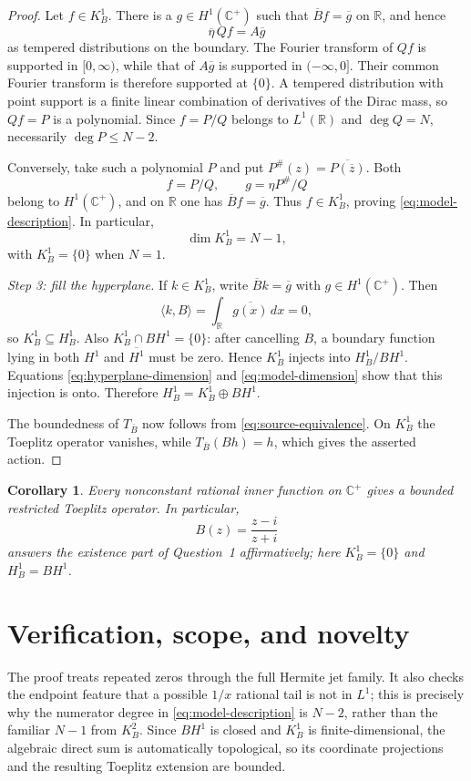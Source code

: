 \documentclass[11pt]{article}
\newtheorem{corollary}[theorem]{Corollary}
\newcommand{\C}{\mathbb C}
\newcommand{\R}{\mathbb R}
\newcommand{\Hone}{H^1(\C^+)}
\begin{document}
\begin{proof}
Let $f\in K^1_B$.  There is a $g\in\Hone$ such that
$\overline Bf=\overline g$ on $\R$, and hence
\[
 \overline\eta\,Qf=A\overline g
\]
as tempered distributions on the boundary.  The Fourier transform of $Qf$
is supported in $[0,\infty)$, while that of $A\overline g$ is supported in
$(-\infty,0]$.  Their common Fourier transform is therefore supported at
$\{0\}$.  A tempered distribution with point support is a finite linear
combination of derivatives of the Dirac mass, so $Qf=P$ is a polynomial.
Since $f=P/Q$ belongs to $L^1(\R)$ and $\deg Q=N$, necessarily
$\deg P\leq N-2$.

Conversely, take such a polynomial $P$ and put
$P^\#(z)=\overline{P(\overline z)}$.  Both
\[
 f=P/Q,
 \qquad g=\eta P^\#/Q
\]
belong to $\Hone$, and on $\R$ one has
$\overline Bf=\overline g$.  Thus $f\in K^1_B$, proving
\eqref{eq:model-description}.  In particular,
\begin{equation}\label{eq:model-dimension}
 \dim K^1_B=N-1,
\end{equation}
with $K^1_B=\{0\}$ when $N=1$.

\emph{Step 3: fill the hyperplane.}
If $k\in K^1_B$, write $\overline Bk=\overline g$ with $g\in\Hone$.
Then
\[
 \langle k,B\rangle=\int_{\R}\overline{g(x)}\,dx=0,
\]
so $K^1_B\subseteq H^1_B$.  Also $K^1_B\cap BH^1=\{0\}$: after cancelling
$B$, a boundary function lying in both $H^1$ and $\overline{H^1}$ must be
zero.  Hence $K^1_B$ injects into $H^1_B/BH^1$.  Equations
\eqref{eq:hyperplane-dimension} and \eqref{eq:model-dimension} show that this
injection is onto.  Therefore
$H^1_B=K^1_B\oplus BH^1$.

The boundedness of $T_{\overline B}$ now follows from
\eqref{eq:source-equivalence}.  On $K^1_B$ the Toeplitz operator vanishes,
while $T_{\overline B}(Bh)=h$, which gives the asserted action.
\end{proof}

\begin{corollary}
Every nonconstant rational inner function on $\C^+$ gives a bounded restricted
Toeplitz operator.  In particular,
\[
 B(z)=\frac{z-i}{z+i}
\]
answers the existence part of Question~1 affirmatively; here
$K^1_B=\{0\}$ and $H^1_B=BH^1$.
\end{corollary}

\section*{Verification, scope, and novelty}

The proof treats repeated zeros through the full Hermite jet family.  It also
checks the endpoint feature that a possible $1/x$ rational tail is not in
$L^1$; this is precisely why the numerator degree in
\eqref{eq:model-description} is $N-2$, rather than the familiar $N-1$ from
$K^2_B$.  Since $BH^1$ is closed and $K^1_B$ is finite-dimensional, the
algebraic direct sum is automatically topological, so its coordinate
projections and the resulting Toeplitz extension are bounded.
\end{document}
